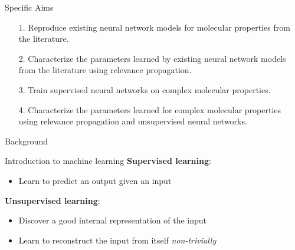 \documentclass[compress]{beamer}
\begin{document}
\begin{frame}{Specific Aims}
  \begin{itemize}
  \item[1.] Reproduce existing neural network models for molecular properties from the literature.
  \item[2.] Characterize the parameters learned by existing neural network models from the literature using relevance propagation.
  \item[3.] Train supervised neural networks on complex molecular properties.
  \item[4.] Characterize the parameters learned for complex molecular properties using relevance propagation and unsupervised neural networks.
  \end{itemize}
\end{frame}


\begin{frame}{Background}
\end{frame}

\begin{frame}{Introduction to machine learning}
  \textbf{Supervised learning}:
  \begin{itemize}
  \item Learn to predict an output given an input
  \end{itemize}
  \textbf{Unsupervised learning}:
  \begin{itemize}
  \item Discover a good internal representation of the input
  \item Learn to reconstruct the input from itself \emph{non-trivially}
  \end{itemize}
\end{frame}
\end{document}
